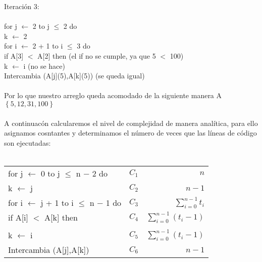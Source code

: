 \documentclass[12pt,twoside]{article}
\begin{document}
Iteraci\'on 3:\\\\
\hspace*{2cm}for j $\leftarrow$ 2 to j $\leq$ 2 do\\
\hspace*{3cm}k $\leftarrow$ 2\\
\hspace*{4cm}for i $\leftarrow$ 2 + 1 to i $\leq$ 3 do\\
\hspace*{4.2cm}if A[3] $<$ A[2] then (el if no se cumple, ya que 5 $<$ 100)\\
\hspace*{6cm}k $\leftarrow$ i (no se hace)\\
\hspace*{3cm}Intercambia (A[j](5),A[k](5)) (se queda igual)\\\\
Por lo que nuestro arreglo queda acomodado de la siguiente manera A$\left\lbrace5, 12, 31, 100\right\rbrace$\\\\
\newpage
A continuac\'on calcularemos el nivel de complejidad de manera anal\'itica, para ello asignamos cosntantes  y determinamos el n\'umero de veces que las l\'ineas de c\'odigo son ejecutadas:\\\\
\begin{tabular}{ l c r }
   \hspace*{1cm}for j $\leftarrow$ 0 to j $\leq$ n $-$ 2 do & $C_{1}$ & $n$ \\
   \hspace*{2cm}k $\leftarrow$ j & $C_{2}$ & $n-1$ \\
   \hspace*{3cm}for i $\leftarrow$ j + 1 to i $\leq$ n $-$ 1 do & $C_{3}$ & $\sum_{i=0}^{n-1}t_{i}$ \\
   \hspace*{3.5cm}if A[i] $<$ A[k] then & $C_{4}$ & $\sum_{i=0}^{n-1}(t_{i}-1)$ \\ \\
   \hspace*{4cm}k $\leftarrow$ i & $C_{5}$ & $\sum_{i=0}^{n-1}(t_{i}-1)$ \\
   \hspace*{2cm}Intercambia (A[j],A[k]) & $C_{6}$ & $n-1$ \\
 \end{tabular}\\\\
\end{document}
